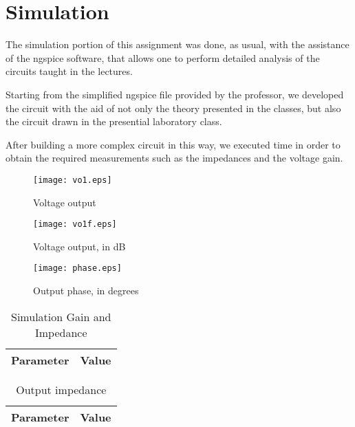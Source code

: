 \section{Simulation}

The simulation portion of this assignment was done, as usual, with the assistance of the ngspice software, that allows one to perform detailed analysis of the circuits taught in the lectures.
\par
Starting from the simplified ngspice file provided by the professor, we developed the circuit with the aid of not only the theory presented in the classes, but also the circuit drawn in the presential laboratory class.
 
After building a more complex circuit in this way, we executed time in order to obtain the required measurements such as the impedances and the voltage gain.

\vspace{5.0cm}

\begin{figure}[h] \centering
\texttt{[image: vo1.eps]}
\caption{ Voltage output }
\end{figure}

\vspace{20.0cm}

\begin{figure}[h] \centering
\texttt{[image: vo1f.eps]}
\caption{ Voltage output, in dB }
\end{figure}

\vspace{20.0cm}

\begin{figure}[h] \centering
\texttt{[image: phase.eps]}
\caption{ Output phase, in degrees}
\end{figure}

\begin{table}[h]
  \centering
  \begin{tabular}{|l|r|}
    \hline    
    {\bf Parameter} & {\bf Value} \\ \hline
    
  \end{tabular}
  \caption{ Simulation Gain and Impedance }
\end{table}

\begin{table}[h]
  \centering
  \begin{tabular}{|l|r|}
    \hline    
    {\bf Parameter} & {\bf Value} \\ \hline
    
  \end{tabular}
  \caption{ Output impedance  }
\end{table}

